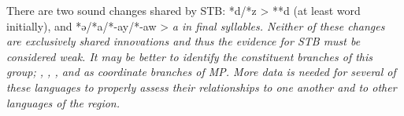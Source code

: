 There are two sound changes shared by STB: *d/*z > **d (at least
word initially), and *ə/*a/*-ay/*-aw > \it{a} in final syllables.
Neither of these changes are exclusively shared innovations
and thus the evidence for STB must be considered weak.
It may be better to identify the constituent branches of this
group; , , , and 
as coordinate branches of MP.
More data is needed for several of these languages to properly
assess their relationships to one another
and to other languages of the region.